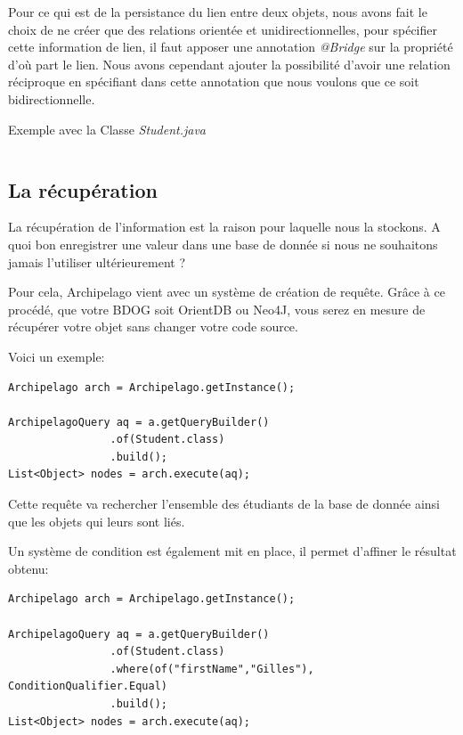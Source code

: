 \documentclass[a4paper,fleqn,12pt]{report}
\begin{document}
Pour ce qui est de la persistance du lien entre deux objets, nous avons fait le choix de ne créer que des relations orientée et unidirectionnelles, pour spécifier cette information de lien, il faut apposer une annotation \textit{@Bridge} sur la propriété d'où part le lien. Nous avons cependant ajouter la possibilité d'avoir une relation réciproque en spécifiant dans cette annotation que nous voulons que ce soit bidirectionnelle. 

Exemple avec la Classe \textit{Student.java}

\begin{lstlisting}

\end{lstlisting}


\subsection{La récupération}

La récupération de l'information est la raison pour laquelle nous la stockons. A quoi bon enregistrer une valeur dans une base de donnée si nous ne souhaitons jamais l'utiliser ultérieurement ?

Pour cela, Archipelago vient avec un système de création de requête. Grâce à ce procédé, que votre BDOG soit OrientDB ou Neo4J, vous serez en mesure de récupérer votre objet sans changer votre code source. 

Voici un exemple:

\begin{lstlisting}
Archipelago arch = Archipelago.getInstance();

ArchipelagoQuery aq = a.getQueryBuilder()
                .of(Student.class)
                .build();
List<Object> nodes = arch.execute(aq);
\end{lstlisting}

Cette requête va rechercher l'ensemble des étudiants de la base de donnée ainsi que les objets qui leurs sont liés.

Un système de condition est également mit en place, il permet d'affiner le résultat obtenu: 

\begin{lstlisting}
Archipelago arch = Archipelago.getInstance();

ArchipelagoQuery aq = a.getQueryBuilder()
                .of(Student.class)
                .where(of("firstName","Gilles"), ConditionQualifier.Equal)
                .build();
List<Object> nodes = arch.execute(aq);
\end{lstlisting}
\end{document}
